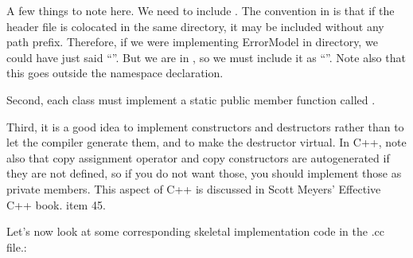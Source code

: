 \documentclass[letterpaper,10pt,english]{sphinxmanual}
\renewcommand{\sphinxcode}[1]{\texttt{\small{#1}}}
\begin{document}
A few things to note here. We need to include \sphinxcode{}. The convention in
 is that if the header file is co\sphinxhyphen{}located in the same directory, it may be
included without any path prefix. Therefore, if we were implementing ErrorModel
in \sphinxcode{} directory, we could have just said “\sphinxcode{}”.
But we are in \sphinxcode{}, so we must include it as “\sphinxcode{}”. Note also that this goes outside the namespace declaration.

Second, each class must implement a static public member function called
\sphinxcode{}.

Third, it is a good idea to implement constructors and destructors rather than
to let the compiler generate them, and to make the destructor virtual. In C++,
note also that copy assignment operator and copy constructors are auto\sphinxhyphen{}generated
if they are not defined, so if you do not want those, you should implement those
as private members. This aspect of C++ is discussed in Scott Meyers’ Effective
C++ book. item 45.

Let’s now look at some corresponding skeletal implementation code in the .cc
file.:
\end{document}
